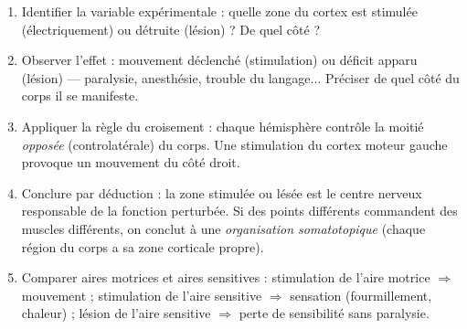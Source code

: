 \documentclass[11pt]{article}
\newcommand{\cle}[1]{{\popxbold\color{popdark}#1}}
\begin{document}
\begin{methode}
\begin{enumerate}
\item \cle{Identifier la variable expérimentale} : quelle zone du cortex est stimulée (électriquement) ou détruite (lésion) ? De quel côté ?
\item \cle{Observer l'effet} : mouvement déclenché (stimulation) ou déficit apparu (lésion) — paralysie, anesthésie, trouble du langage... Préciser de quel côté du corps il se manifeste.
\item \cle{Appliquer la règle du croisement} : chaque hémisphère contrôle la moitié \emph{opposée} (controlatérale) du corps. Une stimulation du cortex moteur gauche provoque un mouvement du côté droit.
\item \cle{Conclure par déduction} : la zone stimulée ou lésée est le centre nerveux responsable de la fonction perturbée. Si des points différents commandent des muscles différents, on conclut à une \emph{organisation somatotopique} (chaque région du corps a sa zone corticale propre).
\item \cle{Comparer aires motrices et aires sensitives} : stimulation de l'aire motrice $\Rightarrow$ mouvement ; stimulation de l'aire sensitive $\Rightarrow$ sensation (fourmillement, chaleur) ; lésion de l'aire sensitive $\Rightarrow$ perte de sensibilité sans paralysie.
\end{enumerate}
\end{methode}
\end{document}
